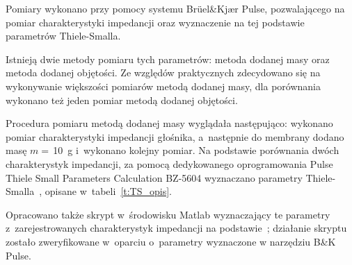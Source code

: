 \documentclass[12pt]{oska}
\begin{document}
			Pomiary wykonano przy pomocy systemu Brüel\&Kjær Pulse, pozwalającego na pomiar charakterystyki impedancji oraz wyznaczenie na tej podstawie parametrów Thiele-Smalla.
			
			Istnieją dwie metody pomiaru tych parametrów: metoda dodanej masy oraz metoda dodanej objętości. Ze względów praktycznych zdecydowano się na wykonywanie większości pomiarów metodą dodanej masy, dla porównania wykonano też jeden pomiar metodą dodanej objętości.
			
			Procedura pomiaru metodą dodanej masy wyglądała następująco: wykonano pomiar charakterystyki impedancji głośnika, a~następnie do membrany dodano masę $m=\,$\SI{10}{\gram} i~wykonano kolejny pomiar. Na podstawie porównania dwóch charakterystyk impedancji, za pomocą dedykowanego oprogramowania Pulse Thiele Small Parameters Calculation BZ-5604 wyznaczano parametry Thiele-Smalla~\cite{BK_pulse_TS}, opisane w~tabeli~\ref{t:TS_opis}.
			
			Opracowano także skrypt w~środowisku Matlab wyznaczający te parametry z~zarejestrowanych charakterystyk impedancji na podstawie~\cite{dobrucki}; działanie skryptu zostało zweryfikowane w~oparciu o~parametry wyznaczone w narzędziu B\&K Pulse.
			
\end{document}
